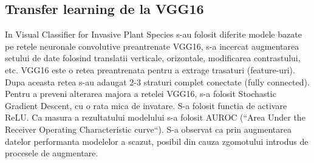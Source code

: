 \documentclass{article}
\begin{document}
\subsection{Transfer learning de la VGG16}
In Visual Classifier for Invasive Plant Species\cite{ARTICLE:4} s-au folosit diferite modele bazate pe retele neuronale convolutive preantrenate VGG16, s-a incercat augmentarea setului de date folosind translatii verticale, orizontale, modificarea contrastului, etc. VGG16 este o retea preantrenata pentru a extrage trasaturi (feature-uri). Dupa aceasta retea s-au adaugat 2-3 straturi complet conectate (fully connected). Pentru a preveni alterarea majora a retelei VGG16, s-a folosit Stochastic Gradient Descent, cu o rata mica de invatare. S-a folosit functia de activare ReLU. Ca masura a rezultatului modelului s-a folosit AUROC (“Area Under the Receiver Operating Characteristic curve“). S-a observat ca prin augmentarea datelor performanta modelelor a scazut, posibil din cauza zgomotului introdus de procesele de augmentare.


 

\end{document}
